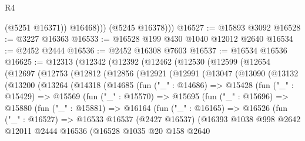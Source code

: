 \begin{lexlean}{R4}
\begin{coremodule}
                (@5251 @16371))
              @16468)))
        (@5245 @16378)))
@16527 := @15893 @3092
@16528 := @3227 @16363
@16533 := @16528 @199 @430 @1040 @12012 @2640
@16534 := @2452 @2444
@16536 := @2452 @16308 @7603
@16537 := @16534 @16536
@16625 := @12313
    (@12342
      (@12392
        (@12462
          (@12530
            (@12599
              (@12654
                (@12697
                  (@12753
                    (@12812
                      (@12856
                        (@12921
                          (@12991
                            (@13047
                              (@13090
                                (@13132
                                  (@13200
                                    (@13264
                                      (@14318
                                        (@14685
                                          (fun ("_" : @14686) =>
                                          @15428
                                            (fun ("_" : @15429) =>
                                            @15569
                                              (fun ("_" : @15570) =>
                                              @15695
                                                (fun ("_" : @15696) =>
                                                @15880
                                                  (fun ("_" : @15881) =>
                                                  @16164
                                                    (fun ("_" : @16165) =>
                                                    @16526
                                                      (fun ("_" : @16527) =>
                                                      @16533
                                                        @16537
                                                        (@2427 @16537)
                                                        (@16393
                                                          @1038
                                                          @998
                                                          @2642
                                                          @12011
                                                          @2444
                                                          @16536
                                                          (@16528
                                                            @1035
                                                            @20
                                                            @158
                                                            @2640

\end{coremodule}
\end{lexlean}
